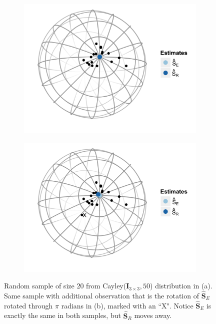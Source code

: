 \documentclass{article}\usepackage[]{graphicx}\usepackage[]{color}
\newcommand{\ProjMean}{{\widehat{\bm S}_{E}}}
\newcommand{\GeomMean}{{\widehat{\bm S}_{R}}}
\begin{document}
\begin{figure}
\centering
\begin{subfigure}[b]{0.45\textwidth}
  \centering
  \includegraphics[width=\textwidth]{Figure/Sample1}
  \caption{}
  \label{fig:samp1}
\end{subfigure}
\begin{subfigure}[b]{0.45\textwidth}
  \centering
  \includegraphics[width=\textwidth]{Figure/Sample2}
  \caption{}
  \label{fig:samp2}
\end{subfigure}
\caption{Random sample of size $20$ from Cayley($\bm I_{3\times 3},50$) distribution in (a).  Same sample with additional observation that is the rotation of $\ProjMean$ rotated through $\pi$ radians in (b), marked with an ``X".  Notice $\ProjMean$ is exactly the same in both samples, but $\GeomMean$ moves away.}
\label{fig:sample}
\end{figure}
\end{document}
